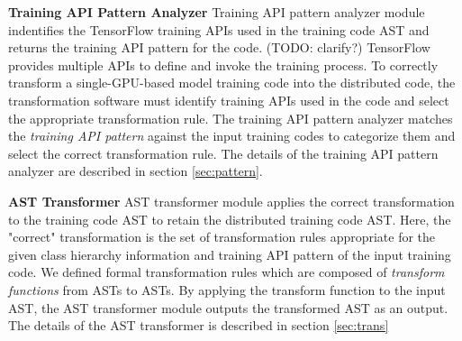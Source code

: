 \textbf{Training API Pattern Analyzer}
Training API pattern analyzer module 
indentifies the TensorFlow training APIs used in the training code AST
and returns the training API pattern for the code. (TODO: clarify?)
TensorFlow provides multiple APIs to define and invoke the training process.
To correctly transform a single-GPU-based model training code into
the distributed code, the transformation software must identify
training APIs used in the code and select the appropriate transformation rule.
The training API pattern analyzer matches the \textit{training API pattern}
against the input training codes to categorize them and select
the correct transformation rule. The details of the training API pattern
analyzer are described in section \ref{sec:pattern}.

\textbf{AST Transformer}
AST transformer module applies the correct transformation to the
training code AST to retain the distributed training code AST.
Here, the "correct" transformation is the set of transformation rules
appropriate for the given class hierarchy information and
training API pattern of the input training code.
We defined formal transformation rules which are composed of
\textit{transform functions} from ASTs to ASTs.
By applying the transform function to the input AST,
the AST transformer module outputs the transformed AST as an output.
The details of the AST transformer is described in section \ref{sec:trans}
